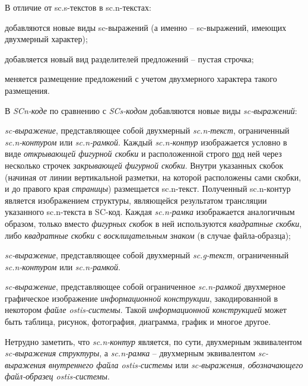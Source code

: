 В отличие от sc.s-текстов в sc.n-текстах:
\begin{textitemize}
	\item добавляются новые виды sc-выражений (а именно -- sc-выражений, имеющих двухмерный характер);
	\item добавляется новый вид разделителей предложений -- пустая строчка;
	\item меняется размещение предложений с учетом двухмерного характера такого размещения.
\end{textitemize}

В \textit{SCn-коде} по сравнению с \textit{SCs-кодом} добавляются новые виды \textit{sc-выражений}:
\begin{textitemize}
	\item \textit{sc-выражение}, представляющее собой двухмерный \textit{\mbox{sc.n-текст}}, ограниченный \textit{sc.n-контуром} или \textit{sc.n-рамкой}. Каждый \textit{sc.n-контур} изображается условно в виде \textit{открывающей фигурной скобки} и расположенной строго \uline{под} ней через несколько строчек \textit{закрывающей фигурной скобки}. Внутри указанных скобок (начиная от линии вертикальной разметки, на которой расположены сами скобки, и до правого края \textit{страницы}) размещается sc.n-текст. Полученный sc.n-контур является изображением структуры, являющейся результатом трансляции указанного sc.n-текста в SC-код. Каждая \textit{sc.n-рамка} изображается аналогичным образом, только вместо \textit{фигурных скобок} в ней используются \textit{квадратные скобки}, либо \textit{квадратные скобки} с \textit{восклицательным знаком} (в случае файла-образца);
	\item \textit{sc-выражение}, представляющее собой двухмерный \textit{sc.g-текст}, ограниченный \textit{\mbox{sc.n-контуром}} или \textit{\mbox{sc.n-рамкой}}.
	\item \textit{sc-выражение}, представляющее собой ограниченное \textit{sc.n-рамкой} двухмерное графическое изображение \textit{информационной конструкции}, закодированной в некотором \textit{файле ostis-системы}. Такой \textit{информационной конструкцией} может быть таблица, рисунок, фотография, диаграмма, график и многое другое.
\end{textitemize}

Нетрудно заметить, что \textit{sc.n-контур} является, по сути, двухмерным эквивалентом \textit{sc-выражения структуры}, а \textit{sc.n-рамка} -- двухмерным эквивалентом \textit{sc-выражения внутреннего файла \mbox{ostis-системы}} или \textit{sc-выражения, обозначающего файл-образец ostis-системы}.

